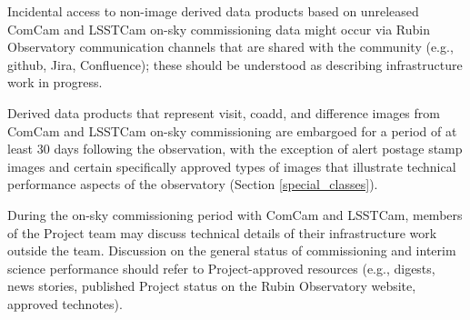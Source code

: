 \documentclass[SE,authoryear,toc]{lsstdoc}
\begin{document}
Incidental access to non-image derived data products based on unreleased ComCam and LSSTCam on-sky commissioning data might occur via Rubin Observatory communication channels that are shared with the community (e.g., github, Jira, Confluence); these should be understood as describing infrastructure work in progress.

Derived data products that represent visit, coadd, and difference images from ComCam and LSSTCam on-sky commissioning are embargoed for a period of at least 30 days following the observation, with the exception of alert postage stamp images and certain specifically approved types of images that illustrate technical performance aspects of the observatory (Section \ref{special_classes}).

During the on-sky commissioning period with ComCam and LSSTCam, members of the Project team may discuss technical details of their infrastructure work outside the team.
Discussion on the general status of commissioning and interim science performance should refer to Project-approved resources (e.g., digests, news stories, published Project status on the Rubin Observatory website, approved technotes).

\end{document}
